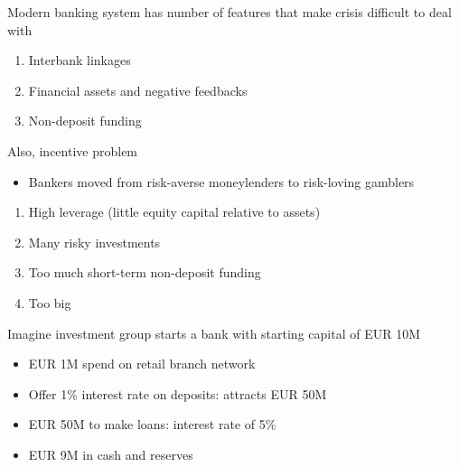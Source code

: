 \documentclass{beamer}
\begin{document}
\begin{frame}
 Modern banking system has number of features that make crisis difficult to deal with
\begin{enumerate}
  \item Interbank linkages
  \item Financial assets and negative feedbacks  
  \item Non-deposit funding  
\end{enumerate}
\end{frame}

\begin{frame}
 Also, incentive problem
 \begin{itemize}
   \item Bankers moved from risk-averse moneylenders to risk-loving gamblers
 \end{itemize}
\begin{enumerate}
  \item High leverage (little equity capital relative to assets)
  \item Many risky investments
  \item Too much short-term non-deposit funding
  \item Too big
\end{enumerate}
\end{frame}

\begin{frame}
  Imagine investment group starts a bank with starting capital of EUR 10M
\begin{itemize}
  \item EUR 1M spend on retail branch network
  \item Offer 1\% interest rate on deposits: attracts EUR 50M
  \item EUR 50M to make loans: interest rate of 5\%
  \item EUR 9M in cash and reserves
\end{itemize}
\end{frame}
\end{document}
